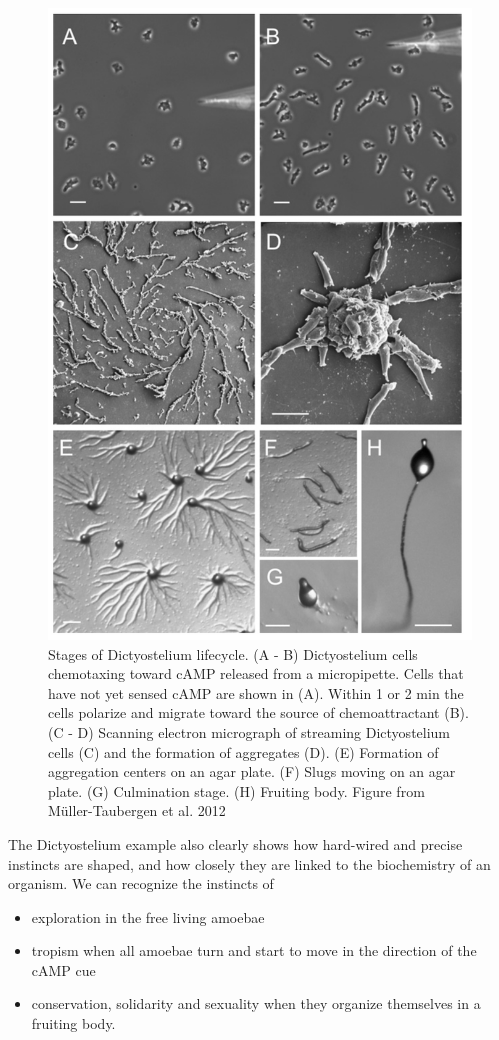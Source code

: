 \documentclass[
  11pt,
]{book}
\providecommand{\tightlist}{%
  \setlength{\itemsep}{0pt}\setlength{\parskip}{0pt}}
\begin{document}
\begin{figure}

{\centering \includegraphics[width=0.6\linewidth]{./figs/Dictyostelida} 

}

\caption{Stages of Dictyostelium lifecycle. (A - B) Dictyostelium cells chemotaxing toward cAMP released from a micropipette. Cells that have not yet sensed cAMP are shown in (A). Within 1 or 2 min the cells polarize and migrate toward the source of chemoattractant (B). (C - D) Scanning electron micrograph of streaming Dictyostelium cells (C) and the formation of aggregates (D). (E) Formation of aggregation centers on an agar plate. (F) Slugs moving on an agar plate. (G) Culmination stage. (H) Fruiting body. Figure from Müller-Taubergen et al. 2012}\label{fig:Dictyostelium}
\end{figure}

The Dictyostelium example also clearly shows how hard-wired and precise instincts are shaped, and how closely they are linked to the biochemistry of an organism. We can recognize the instincts of

\begin{itemize}
\tightlist
\item
  exploration in the free living amoebae
\item
  tropism when all amoebae turn and start to move in the direction of the cAMP cue
\item
  conservation, solidarity and sexuality when they organize themselves in a fruiting body.
\end{itemize}
\end{document}

